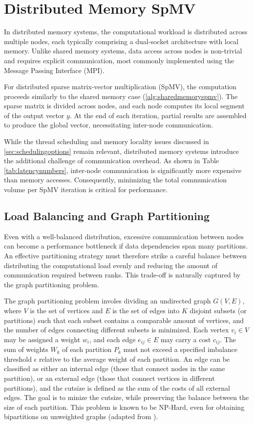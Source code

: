 \section{Distributed Memory SpMV}
In distributed memory systems, the computational workload is distributed across multiple nodes, each typically comprising a dual-socket architecture with local memory. Unlike shared memory systems, data access across nodes is non-trivial and requires explicit communication, most commonly implemented using the Message Passing Interface (MPI).

For distributed sparse matrix-vector multiplication (SpMV), the computation proceeds similarly to the shared memory case (\autoref{alg:sharedmemoryspmv}). The sparse matrix is divided across nodes, and each node computes its local segment of the output vector \(y\). At the end of each iteration, partial results are assembled to produce the global vector, necessitating inter-node communication.

\medskip

While the thread scheduling and memory locality issues discussed in \ref{sec:schedulingoptions} remain relevant, distributed memory systems introduce the additional challenge of communication overhead. As shown in Table \ref{tab:latencynumbers}, inter-node communication is significantly more expensive than memory accesses. Consequently, minimizing the total communication volume per SpMV iteration is critical for performance.


\subsection{Load Balancing and Graph Partitioning}
Even with a well-balanced distribution, excessive communication between nodes can become a performance bottleneck if data dependencies span many partitions. An effective partitioning strategy must therefore strike a careful balance between distributing the computational load evenly and reducing the amount of communication required between ranks. This trade-off is naturally captured by the graph partitioning problem.
\medskip

The graph partitioning problem involes dividing an undirected graph \(G(V,E)\), where \(V\) is the set of vertices and \(E\) is the set of edges into \(K\) disjoint subsets (or partitions) such that each subset contains a comparable amount of vertices, and the number of edges connecting different subsets is minimized. Each vertex \(v_{i} \in V\) may be assigned a weight \(w_{i}\), and each edge \(e_{ij} \in E\) may carry a cost \(c_{ij}\). The sum of weights \(W_{k}\) of each partition \(P_{k}\) must not exceed a specified imbalance threshold \(\epsilon\) relative to the average weight of each partition. An edge can be classified as either an internal edge (those that connect nodes in the same partition), or an external edge (those that connect vertices in different partitions), and the cutsize is defined as the sum of the costs of all external edges. The goal is to minize the cutsize, while preserving the balance between the size of each partition. This problem is known to be NP-Hard, even for obtaining bipartitions on unweighted graphs (adapted from \cite{hypergraphpartitioning}).
\medskip

